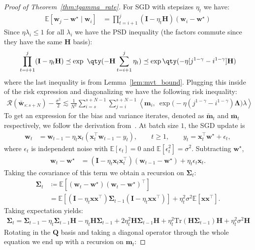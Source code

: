 \documentclass{article}
\def\bw{\bar{\mathbf{w}}}
\def\la{\langle

}
\def\ra{\rangle}
\def\x{{\mathbf{x}}}
\def\w{{\mathbf{w}}}
\def\m{{\mathbf{m}}}
\def\H{{\mathbf{H}}}
\def\Q{{\mathbf{Q}}}
\def\H{{\mathbf{H}}}
\def\I{{\mathbf{I}}}
\def\risk{\mathcal{R}}
\def\bm{\widetilde{\m}}
\def\vm{\overline{\m}}
\def\LLambda{{\mathbf{\Lambda}}}
\def\SSigma{\mathbf{\Sigma}}
\def\tr{\text{Tr}}
\def\ra{{\textnormal{a}}}
\def\vm{{\bm{m}}}
\newcommand{\E}{\mathbb{E}}
\def\bw{\bar{\mathbf{w}}}
\def\la{\langle}
\def\ra{\rangle}
\def\x{{\mathbf{x}}}
\def\w{{\mathbf{w}}}
\def\m{{\mathbf{m}}}
\def\H{{\mathbf{H}}}
\def\Q{{\mathbf{Q}}}
\def\H{{\mathbf{H}}}
\def\risk{\mathcal{R}}
\def\bm{\widetilde{\m}}
\def\vm{\overline{\m}}
\def\LLambda{{\mathbf{\Lambda}}}
\def\SSigma{\mathbf{\Sigma}}
\def\tr{\text{Tr}}
\def\I{\mathbf{I}}
\theoremstyle{plain}
\def\bw{\bar{\mathbf{w}}}
\def\la{\left\langle}
\def\ra{\right\rangle}
\def\x{{\mathbf{x}}}
\def\w{{\mathbf{w}}}
\def\m{{\mathbf{m}}}
\def\H{{\mathbf{H}}}
\def\Q{{\mathbf{Q}}}
\def\I{{\mathbf{I}}}
\def\risk{\mathcal{R}}
\def\bm{\widetilde{\m}}
\def\vm{\overline{\m}}
\def\E{\mathbb{E}}
\def\LLambda{{\mathbf{\Lambda}}}
\def\SSigma{\mathbf{\Sigma}}
\begin{document}
\begin{proof}[Proof of Theorem~\ref{thm:tgamma_rate}]
For SGD with stepsizes $\eta_t$ we have:
\begin{align*}
    \E[\w_j-\w^\star \mid \w_i]
    &= \prod_{t=i+1}^{j}(\I-\eta_t \H)(\w_i-\w^\star)
\end{align*}
Since $\eta \lambda_i \leq 1$ for all $\lambda_i$ we have the PSD inequality (the factors commute since they have the same $\H$ basis):
\[
\prod_{t=i+1}^{j}(\I-\eta_t \H) \preceq \exp\ \qty(-\H\sum_{t=i+1}^{j}\eta_t) \preceq \exp\qty(-\eta [j^{1-\gamma} - i^{1-\gamma}]\H)
\]
where the last inequality is from Lemma~\ref{lem:mvt_bound}. Plugging this inside of the risk expression and diagonalizing we have the following risk inequality:
\begin{align}
    \label{eq:risk}
    \risk(\bw_{s:s+N}) - \frac{\sigma^2}{2}
    \lesssim
    \frac{1}{N^2}\sum_{i=s}^{s+N-1}\sum_{j=i}^{s+N-1}
    \la \m_i,\ \exp\Big(-\eta(j^{1-\gamma}-i^{1-\gamma})\LLambda\Big)\lambda \ra
\end{align}
To get an expression for the bias and variance iterates, denoted as $\bm_t$ and $\vm_t$ respectively, we follow the derivation from~\citet{meterez2025simplified}. At batch size $1$, the SGD update is
\begin{align*}
    \w_t
    &= \w_{t-1} - \eta_t \x_t(\x_t^\top \w_{t-1} - y_t),
    \qquad t\geq1,
    \qquad
    y_t = \x_t^\top \w^\star + \epsilon_t ,
\end{align*}
where $\epsilon_t$ is independent noise with $\E[\epsilon_t]=0$ and
$\E[\epsilon_t^2]=\sigma^2$.
Subtracting $\w^\star$,
\begin{align*}
    \w_t-\w^\star
    &= (\I-\eta_t \x_t\x_t^\top)(\w_{t-1}-\w^\star)
    + \eta_t \epsilon_t \x_t .
\end{align*}
Taking the covariance of this term we obtain a recursion on $\SSigma_t$:
\begin{align*}
    \SSigma_t
    &\coloneqq \E[(\w_t-\w^\star)(\w_t-\w^\star)^\top] \\
    &=
    \E\left[
        (\I-\eta_t \x\x^\top)\SSigma_{t-1}(\I-\eta_t \x\x^\top)
    \right]
    + \eta_t^2\sigma^2 \E[\x\x^\top].
\end{align*}
Taking expectation yields:
\begin{align*}
    \SSigma_t = \SSigma_{t-1} - \eta_t \SSigma_{t-1} \H - \eta_t \H \SSigma_{t-1} + 2 \eta_t^2 \H \SSigma_{t-1} \H + \eta_t^2 \tr(\H \SSigma_{t-1}) \H + \eta_t^2 \sigma^2 \H
\end{align*}
Rotating in the $\Q$ basis and taking a diagonal operator through the whole equation we end up with a recursion on $\m_t$:

\end{proof}
\end{document}
